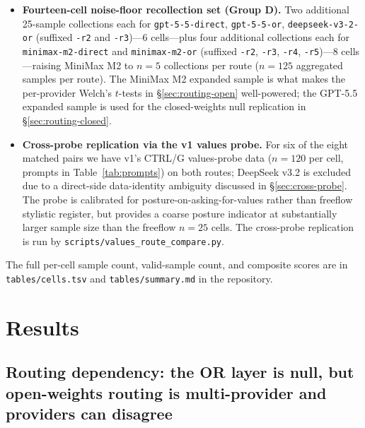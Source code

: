 \documentclass[11pt,a4paper]{article}
\begin{document}
\begin{itemize}[leftmargin=2em, itemsep=0.3em]
    \item \begin{sloppypar}\textbf{Fourteen-cell noise-floor recollection set (Group D).} Two additional 25-sample collections each for \texttt{gpt-5-5-\allowbreak direct}, \texttt{gpt-5-5-or}, \texttt{deepseek-v3-2-or} (suffixed \texttt{-r2} and \texttt{-r3})---6 cells---plus four additional collections each for \texttt{minimax-m2-\allowbreak direct} and \texttt{minimax-m2-or} (suffixed \texttt{-r2}, \texttt{-r3}, \texttt{-r4}, \texttt{-r5})---8 cells---raising MiniMax M2 to $n{=}5$ collections per route ($n{=}125$ aggregated samples per route). The MiniMax M2 expanded sample is what makes the per-provider Welch's $t$-tests in \S\ref{sec:routing-open} well-powered; the GPT-5.5 expanded sample is used for the closed-weights null replication in \S\ref{sec:routing-closed}.\end{sloppypar}

    \item \begin{sloppypar}\textbf{Cross-probe replication via the v1 values probe.} For six of the eight matched pairs we have v1's CTRL/G values-probe data ($n{=}120$ per cell, prompts in Table~\ref{tab:prompts}) on both routes; DeepSeek v3.2 is excluded due to a direct-side data-identity ambiguity discussed in \S\ref{sec:cross-probe}. The probe is calibrated for posture-on-asking-for-values rather than freeflow stylistic register, but provides a coarse posture indicator at substantially larger sample size than the freeflow $n{=}25$ cells. The cross-probe replication is run by \texttt{scripts/\allowbreak values\_route\_compare.py}.\end{sloppypar}
\end{itemize}

\begin{sloppypar}The full per-cell sample count, valid-sample count, and composite scores are in \texttt{tables/\allowbreak cells.tsv} and \texttt{tables/\allowbreak summary.md} in the repository.\end{sloppypar}

\section{Results}
\label{sec:results}

\subsection{Routing dependency: the OR layer is null, but open-weights routing is multi-provider and providers can disagree}
\label{sec:routing-overview}
\end{document}

